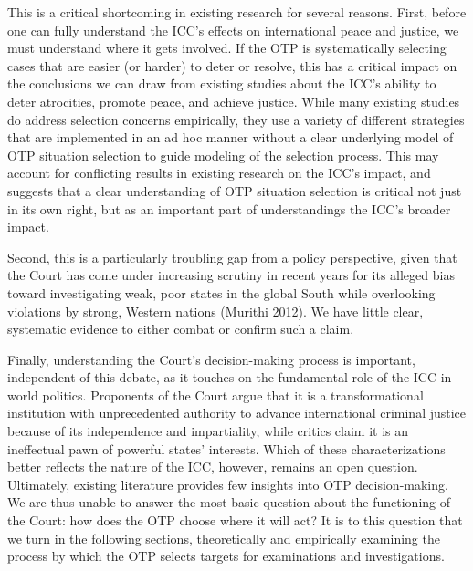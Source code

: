 This is a critical shortcoming in existing research for several reasons. First, before one can fully understand the ICC's effects on international peace and justice, we must understand where it gets involved. If the OTP is systematically selecting cases that are easier (or harder) to deter or resolve, this has a critical impact on the conclusions we can draw from existing studies about the ICC's ability to deter atrocities, promote peace, and achieve justice. While many existing studies do address selection concerns empirically, they use a variety of different strategies that are implemented in an ad hoc manner without a clear underlying model of OTP situation selection to guide modeling of the selection process. This may account for conflicting results in existing research on the ICC's impact, and suggests that a clear understanding of OTP situation selection is critical not just in its own right, but as an important part of understandings the ICC's broader impact.

Second, this is a particularly troubling gap from a policy perspective, given that the Court has come under increasing scrutiny in recent years for its alleged bias toward investigating weak, poor states in the global South while overlooking violations by strong, Western nations (Murithi 2012). We have little clear, systematic evidence to either combat or confirm such a claim.

Finally, understanding the Court's decision-making process is important, independent of this debate, as it touches on the fundamental role of the ICC in world politics. Proponents of the Court argue that it is a transformational institution with unprecedented authority to advance international criminal justice because of its independence and impartiality, while critics claim it is an ineffectual pawn of powerful states' interests. Which of these characterizations better reflects the nature of the ICC, however, remains an open question. Ultimately, existing literature provides few insights into OTP decision-making. We are thus unable to answer the most basic question about the functioning of the Court: how does the OTP choose where it will act? It is to this question that we turn in the following sections, theoretically and empirically examining the process by which the OTP selects targets for examinations and investigations.
